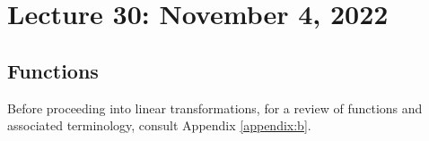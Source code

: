 \section{Lecture 30: November 4, 2022}

    \subsection{Functions}

        Before proceeding into linear transformations, for a review of functions and associated terminology, consult Appendix \ref{appendix:b}.
